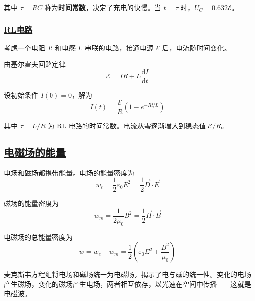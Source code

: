 其中 $\tau = RC$ 称为\textbf{时间常数}，决定了充电的快慢。当 $t = \tau$ 时，$U_C = 0.632\mathcal{E}$。

\subsubsection{\protect\hyperlink{:}{RL电路}}

考虑一个电阻 $R$ 和电感 $L$ 串联的电路，接通电源 $\mathcal{E}$ 后，电流随时间变化。

由基尔霍夫回路定律
\begin{equation}
    \mathcal{E} = IR + L\frac{\mathrm{d}I}{\mathrm{d}t}
\end{equation}

设初始条件 $I(0) = 0$，解为
\begin{equation}
    I(t) = \frac{\mathcal{E}}{R}\left(1 - e^{-Rt/L}\right)
\end{equation}

其中 $\tau = L/R$ 为 RL 电路的时间常数。电流从零逐渐增大到稳态值 $\mathcal{E}/R$。

\subsection{\protect\hyperlink{:}{电磁场的能量}}

电场和磁场都携带能量。电场的能量密度为
\begin{equation}
    w_e = \frac{1}{2}\varepsilon_0 E^2 = \frac{1}{2}\vec{D}\cdot\vec{E}
\end{equation}

磁场的能量密度为
\begin{equation}
    w_m = \frac{1}{2\mu_0}B^2 = \frac{1}{2}\vec{H}\cdot\vec{B}
\end{equation}

电磁场的总能量密度为
\begin{equation}
    w = w_e + w_m = \frac{1}{2}\left(\varepsilon_0 E^2 + \frac{B^2}{\mu_0}\right)
\end{equation}

\begin{remark}
    麦克斯韦方程组将电场和磁场统一为电磁场，揭示了电与磁的统一性。变化的电场产生磁场，变化的磁场产生电场，两者相互依存，以光速在空间中传播——这就是电磁波。
\end{remark}
